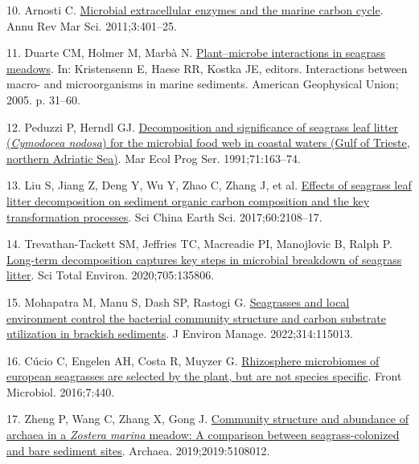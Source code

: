 \documentclass[
  12 pt,
]{article}
\newlength{\cslhangindent}
\newlength{\cslentryspacingunit} %
\newenvironment{CSLReferences}[2] %
 {%
  \setlength{\parindent}{0pt}
  \ifodd #1
  \let\oldpar\par
  \def\par{\hangindent=\cslhangindent\oldpar}
  \fi
  \setlength{\parskip}{#2\cslentryspacingunit}
 }%
 {}
\begin{document}
\begin{CSLReferences}{0}{0}
\leavevmode{}%
10. Arnosti C. \href{https://doi.org/10.1146/annurev-marine-120709-142731}{Microbial extracellular enzymes and the marine carbon cycle}. Annu Rev Mar Sci. 2011;3:401--25.

\leavevmode{}%
11. Duarte CM, Holmer M, Marbà N. \href{https://doi.org/10.1029/CE060p0031}{Plant--microbe interactions in seagrass meadows}. In: Kristensenn E, Haese RR, Kostka JE, editors. Interactions between macro- and microorganisms in marine sediments. American Geophysical Union; 2005. p. 31--60.

\leavevmode{}%
12. Peduzzi P, Herndl GJ. \href{https://doi.org/10.3354/meps071163}{Decomposition and significance of seagrass leaf litter ({{\emph{Cymodocea nodosa}}}) for the microbial food web in coastal waters ({Gulf} of {Trieste}, northern {Adriatic Sea})}. Mar Ecol Prog Ser. 1991;71:163--74.

\leavevmode{}%
13. Liu S, Jiang Z, Deng Y, Wu Y, Zhao C, Zhang J, et al. \href{https://doi.org/10.1007/s11430-017-9147-4}{Effects of seagrass leaf litter decomposition on sediment organic carbon composition and the key transformation processes}. Sci China Earth Sci. 2017;60:2108--17.

\leavevmode{}%
14. Trevathan-Tackett SM, Jeffries TC, Macreadie PI, Manojlovic B, Ralph P. \href{https://doi.org/10.1016/j.scitotenv.2019.135806}{Long-term decomposition captures key steps in microbial breakdown of seagrass litter}. Sci Total Environ. 2020;705:135806.

\leavevmode{}%
15. Mohapatra M, Manu S, Dash SP, Rastogi G. \href{https://doi.org/10.1016/j.jenvman.2022.115013}{Seagrasses and local environment control the bacterial community structure and carbon substrate utilization in brackish sediments}. J Environ Manage. 2022;314:115013.

\leavevmode{}%
16. Cúcio C, Engelen AH, Costa R, Muyzer G. \href{https://doi.org/10.3389/fmicb.2016.00440}{Rhizosphere microbiomes of european seagrasses are selected by the plant, but are not species specific}. Front Microbiol. 2016;7:440.

\leavevmode{}%
17. Zheng P, Wang C, Zhang X, Gong J. \href{https://doi.org/10.1155/2019/5108012}{Community structure and abundance of archaea in a {{\emph{Zostera marina}}} meadow: A comparison between seagrass-colonized and bare sediment sites}. Archaea. 2019;2019:5108012.


\end{CSLReferences}
\end{document}
